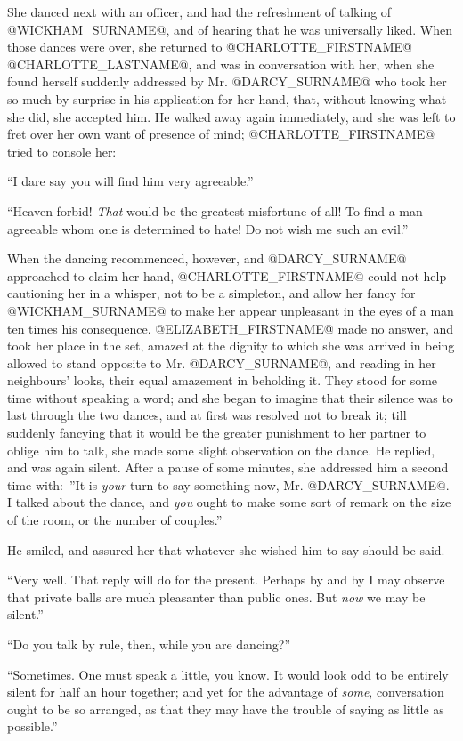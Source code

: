 She danced next with an officer, and had the refreshment of talking of
@WICKHAM_SURNAME@, and of hearing that he was universally liked. When those dances
were over, she returned to @CHARLOTTE_FIRSTNAME@ @CHARLOTTE_LASTNAME@, and was in conversation with
her, when she found herself suddenly addressed by Mr. @DARCY_SURNAME@ who took
her so much by surprise in his application for her hand, that,
without knowing what she did, she accepted him. He walked away again
immediately, and she was left to fret over her own want of presence of
mind; @CHARLOTTE_FIRSTNAME@ tried to console her:

``I dare say you will find him very agreeable.''

``Heaven forbid! \textit{That} would be the greatest misfortune of all! To find
a man agreeable whom one is determined to hate! Do not wish me such an
evil.''

When the dancing recommenced, however, and @DARCY_SURNAME@ approached to claim her
hand, @CHARLOTTE_FIRSTNAME@ could not help cautioning her in a whisper, not to be a
simpleton, and allow her fancy for @WICKHAM_SURNAME@ to make her appear unpleasant
in the eyes of a man ten times his consequence. @ELIZABETH_FIRSTNAME@ made no
answer, and took her place in the set, amazed at the dignity to which
she was arrived in being allowed to stand opposite to Mr. @DARCY_SURNAME@, and
reading in her neighbours' looks, their equal amazement in beholding
it. They stood for some time without speaking a word; and she began to
imagine that their silence was to last through the two dances, and at
first was resolved not to break it; till suddenly fancying that it would
be the greater punishment to her partner to oblige him to talk, she made
some slight observation on the dance. He replied, and was again
silent. After a pause of some minutes, she addressed him a second time
with:--''It is \textit{your} turn to say something now, Mr. @DARCY_SURNAME@. I talked
about the dance, and \textit{you} ought to make some sort of remark on the size
of the room, or the number of couples.''

He smiled, and assured her that whatever she wished him to say should be
said.

``Very well. That reply will do for the present. Perhaps by and by I may
observe that private balls are much pleasanter than public ones. But
\textit{now} we may be silent.''

``Do you talk by rule, then, while you are dancing?''

``Sometimes. One must speak a little, you know. It would look odd to be
entirely silent for half an hour together; and yet for the advantage of
\textit{some}, conversation ought to be so arranged, as that they may have the
trouble of saying as little as possible.''

